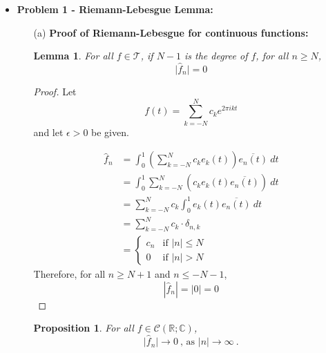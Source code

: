 \documentclass[12pt, reqno]{amsart}
\newtheorem{prop}{Proposition}[section]
\newtheorem{lemma}[theorem]{Lemma}
\theoremstyle{definition}
\theoremstyle{remark}
\begin{document}
\begin{itemize}

\vspace{0.2 cm}
\item {\bf{Problem 1 - Riemann-Lebesgue Lemma:}} 

\vspace{0.1 cm}
\begin{itemize}
\item[(a)] {\bf{Proof of Riemann-Lebesgue for continuous functions:}}

\begin{lemma}
For all $f\in\mathcal{T}$, if $N-1$ is the degree of $f$, for all $n\ge N$, \[
\vert \widehat{f}_n \vert = 0 
\]
\end{lemma}

\begin{proof}
   
Let $$f(t)=\sum_{k=-N}^{N}c_{k}e^{2\pi ikt}$$and let $\epsilon>0$ be given. 

\begin{align*}
\hat{f}_{n}&= \int_{0}^{1}\left(\sum_{k=-N}^{N}c_{k}e_{k}(t)\right)\overline{e_{n}(t)}\ dt\\
&= \int_{0}^{1}\sum_{k=-N}^{N}(c_{k}e_{k}(t)\overline{e_{n}(t)})\ dt\\
&= \sum_{k=-N}^{N}c_{k}\int_{0}^{1}e_{k}(t)\overline{e_{n}(t)}\ dt\\
&= \sum_{k=-N}^{N}c_{k}\cdot \delta_{n,k}\\
&= \begin{cases}c_{n} & \text{if } |n|\le N\\
0 & \text{if }|n|>N
\end{cases}
\end{align*}
Therefore, for all $n\ge N+1$ and $n\le -N-1$, $$|\hat{f}_{n}|=|0|=0$$
\end{proof}

\begin{prop}
For all $f\in\mathcal{C}(\mathbb{R;C})$, \[
\vert \widehat{f}_n \vert \to 0 ~\mbox{, as } \vert n \vert \to \infty ~\mbox{.}
\]
\end{prop}


\end{itemize}
\end{itemize}
\end{document}
